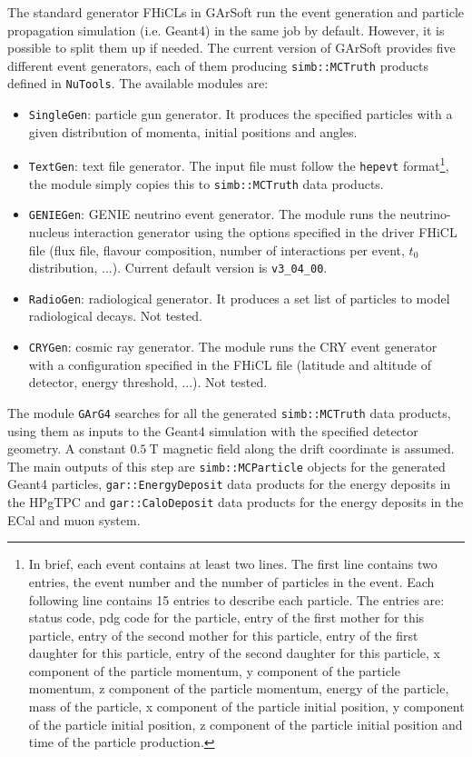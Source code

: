 The standard generator FHiCLs in GArSoft run the event generation and particle propagation simulation (i.e. Geant4) in the same job by default. However, it is possible to split them up if needed. The current version of GArSoft provides five different event generators, each of them producing \texttt{simb::MCTruth} products defined in \texttt{NuTools}. The available modules are:
\begin{itemize}
	\item \texttt{SingleGen}: particle gun generator. It produces the specified particles with a given distribution of momenta, initial positions and angles.
	\item \texttt{TextGen}: text file generator. The input file must follow the \texttt{hepevt} format\footnote{In brief, each event contains at least two  lines.  The first line contains two entries, the event number and the number of particles in the event. Each following line contains 15 entries to describe each particle. The entries are: status code, pdg code for the particle, entry of the first mother for this particle, entry of the second mother for this particle, entry of the first daughter for this particle, entry of the second daughter for this particle, x component of the particle momentum, y component of the particle momentum, z component of the particle momentum, energy of the particle, mass of the particle, x component of the particle initial position, y component of the particle initial position, z component of the particle initial position and time of the particle production.}, the module simply copies this to \texttt{simb::MCTruth} data products.
	\item \texttt{GENIEGen}: GENIE neutrino event generator. The module runs the neutrino-nucleus interaction generator using the options specified in the driver FHiCL file (flux file, flavour composition, number of interactions per event, $t_{0}$ distribution, ...). Current default version is \texttt{v3_04_00}.
	\item \texttt{RadioGen}: radiological generator. It produces a set list of particles to model radiological decays. Not tested.
	\item \texttt{CRYGen}: cosmic ray generator. The module runs the CRY event generator with a configuration specified in the FHiCL file (latitude and altitude of detector, energy threshold, ...). Not tested.
\end{itemize}

The module \texttt{GArG4} searches for all the generated \texttt{simb::MCTruth} data products, using them as inputs to the Geant4 simulation with the specified detector geometry. A constant $0.5~\mathrm{T}$ magnetic field along the drift coordinate is assumed. The main outputs of this step are \texttt{simb::MCParticle} objects for the generated Geant4 particles, \texttt{gar::EnergyDeposit} data products for the energy deposits in the HPgTPC and \texttt{gar::CaloDeposit} data products for the energy deposits in the ECal and muon system.

